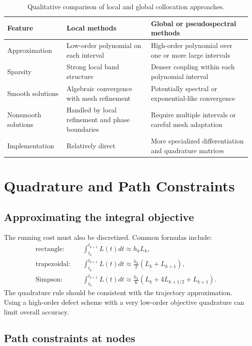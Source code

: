 \documentclass[11pt]{article}
\begin{document}
\begin{table}[H]
\centering
\caption{Qualitative comparison of local and global collocation approaches.}
\begin{tabular}{>{\raggedright\arraybackslash}p{3.1cm} >{\raggedright\arraybackslash}p{4.6cm} >{\raggedright\arraybackslash}p{4.6cm}}
\toprule
Feature & Local methods & Global or pseudospectral methods \\
\midrule
Approximation & Low-order polynomial on each interval & High-order polynomial over one or more large intervals \\
Sparsity & Strong local band structure & Denser coupling within each polynomial interval \\
Smooth solutions & Algebraic convergence with mesh refinement & Potentially spectral or exponential-like convergence \\
Nonsmooth solutions & Handled by local refinement and phase boundaries & Require multiple intervals or careful mesh adaptation \\
Implementation & Relatively direct & More specialized differentiation and quadrature matrices \\
\bottomrule
\end{tabular}
\end{table}

\section{Quadrature and Path Constraints}

\subsection{Approximating the integral objective}

The running cost must also be discretized. Common formulas include:
\begin{align}
\text{rectangle:} \quad &
\int_{t_k}^{t_{k+1}}L(t)dt\approx h_kL_k,\\
\text{trapezoidal:} \quad &
\int_{t_k}^{t_{k+1}}L(t)dt\approx\frac{h_k}{2}(L_k+L_{k+1}),\\
\text{Simpson:} \quad &
\int_{t_k}^{t_{k+1}}L(t)dt\approx\frac{h_k}{6}(L_k+4L_{k+1/2}+L_{k+1}).
\end{align}
The quadrature rule should be consistent with the trajectory approximation. Using a high-order defect scheme with a very low-order objective quadrature can limit overall accuracy.

\subsection{Path constraints at nodes}
\end{document}
